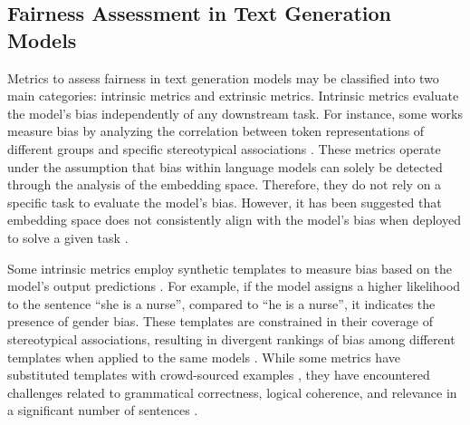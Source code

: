 \documentclass[letterpaper]{article} %
\newcommand{\goncalo}[1]
{\textcolor{orange}{{\bf}{\em #1}{\bf}}}
\begin{document}

\subsection{Fairness Assessment in Text Generation Models}\label{sec:fairness_metrics}
Metrics to assess fairness in text generation models may be classified into two main categories: intrinsic metrics and extrinsic metrics. Intrinsic metrics evaluate the model's bias independently of any downstream task. For instance, some works measure bias by analyzing the correlation between token representations of different groups and specific stereotypical associations \cite{caliskan2017semantics,guo2021detecting,may2019measuring}.  These metrics operate under the assumption that bias within language models can solely be detected through the analysis of the embedding space. Therefore, they do not rely on a specific task to evaluate the model's bias. However, it has been suggested that embedding space does not consistently align with the model's bias when deployed to solve a given task \cite{cao-etal-2022-intrinsic,delobelle-etal-2022-measuring}. 

Some intrinsic metrics employ synthetic templates to measure bias based on the model's output predictions  \cite{webster2020measuring,kurita2019measuring}. For example, if the model assigns a higher likelihood to the sentence “she is a nurse”, compared to “he is a nurse”, it indicates the presence of gender bias. These templates are constrained in their coverage of stereotypical associations, resulting in divergent rankings of bias among different templates when applied to the same models \cite{delobelle-etal-2022-measuring}. While some metrics have substituted templates with crowd-sourced examples \cite{nadeem2021stereoset,nangia2020crows}, they have encountered challenges related to grammatical correctness, logical coherence, and relevance in a significant number of sentences \cite{blodgett2021stereotyping}. %
\end{document}
